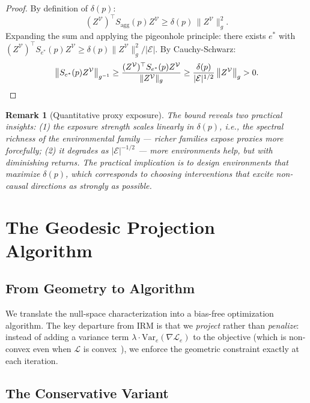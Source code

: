 \documentclass[11pt,a4paper]{article}
\newtheorem{remark}{Remark}
\newcommand{\cV}{\mathcal{V}}
\newcommand{\cE}{\mathcal{E}}
\begin{document}
\begin{proof}
By definition of $\delta(p)$:
\[
(Z^\cV)^\top S_{\mathrm{agg}}(p) Z^\cV \geq \delta(p)\,\bigl\|Z^\cV\bigr\|_g^2.
\]
Expanding the sum and applying the pigeonhole principle: there exists $e^*$ with $(Z^\cV)^\top S_{e^*}(p) Z^\cV \geq \delta(p)\|Z^\cV\|_g^2 / |\cE|$. By Cauchy-Schwarz:
\[
\bigl\|S_{e^*}(p) Z^\cV\bigr\|_{g^{-1}} \geq \frac{(Z^\cV)^\top S_{e^*}(p) Z^\cV}{\|Z^\cV\|_g} \geq \frac{\delta(p)}{|\cE|^{1/2}}\,\bigl\|Z^\cV\bigr\|_g > 0. \qedhere
\]
\end{proof}

\begin{remark}[Quantitative proxy exposure]
The bound reveals two practical insights: (1) the exposure strength scales linearly in $\delta(p)$, i.e., the spectral richness of the environmental family — richer families expose proxies more forcefully; (2) it degrades as $|\cE|^{-1/2}$ — more environments help, but with diminishing returns. The practical implication is to design environments that maximize $\delta(p)$, which corresponds to choosing interventions that excite non-causal directions as strongly as possible.
\end{remark}

\section{The Geodesic Projection Algorithm}
\label{sec:algorithm}

\subsection{From Geometry to Algorithm}

We translate the null-space characterization into a bias-free optimization algorithm. The key departure from IRM is that we \emph{project} rather than \emph{penalize}: instead of adding a variance term $\lambda \cdot \mathrm{Var}_e(\nabla \mathcal{L}_e)$ to the objective (which is non-convex even when $\mathcal{L}$ is convex~\cite{rosenfeld2020}), we enforce the geometric constraint exactly at each iteration.

\subsection{The Conservative Variant}
\end{document}
